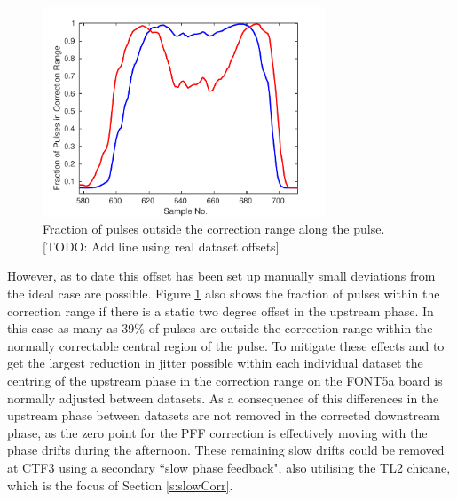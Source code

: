 \begin{figure}
  \centering
  \includegraphics[width=0.75\textwidth]{Figures/feedforward/longFF_fractInRange}
  \caption{Fraction of pulses outside the correction range along the pulse. [TODO: Add line using real dataset offsets]}
  \label{f:longFF_fractInRange}
\end{figure}

However, as to date this offset has been set up manually small deviations from the ideal case are possible. Figure \ref{f:longFF_fractInRange} also shows the fraction of pulses within the correction range if there is a static two degree offset in the upstream phase. In this case as many as 39\% of pulses are outside the correction range within the normally correctable central region of the pulse. To mitigate these effects and to get the largest reduction in jitter possible within each individual dataset the centring of the upstream phase in the correction range on the FONT5a board is normally adjusted between datasets. As a consequence of this differences in the upstream phase between datasets are not removed in the corrected downstream phase, as the zero point for the PFF correction is effectively moving with the phase drifts during the afternoon. These remaining slow drifts could be removed at CTF3 using a secondary ``slow phase feedback", also utilising the TL2 chicane, which is the focus of Section \ref{s:slowCorr}.

